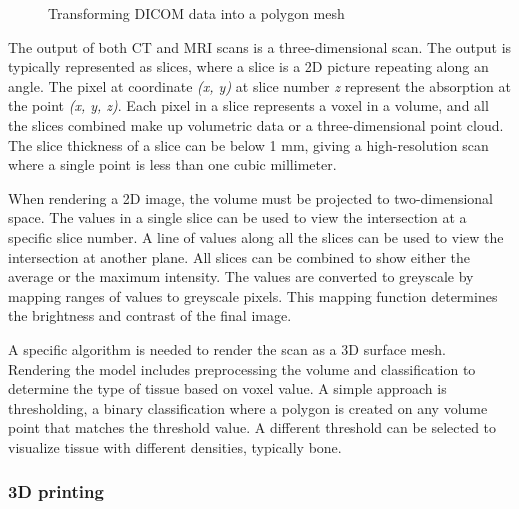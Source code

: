 \documentclass[a4paper]{report}
\begin{document}
\begin{figure}[h!]
    \centering
	\hfill
  \caption{Transforming DICOM data into a polygon mesh}
\end{figure}

The output of both CT and MRI scans is a three-dimensional scan. The output is typically represented as slices, where a slice is a 2D picture repeating along an angle. The pixel at coordinate \emph{(x, y)} at slice number \emph{z} represent the absorption at the point \emph{(x, y, z)}\cite{chougule_conversions_2013}.
Each pixel in a slice represents a voxel in a volume, and all the slices combined make up volumetric data or a three-dimensional point cloud\cite{chougule_conversions_2013}.
The slice thickness of a slice can be below 1 mm, giving a high-resolution scan where a single point is less than one cubic millimeter\cite{hamblen_outline_2010}.

When rendering a 2D image, the volume must be projected to two-dimensional space. The values in a single slice can be used to view the intersection at a specific slice number. A line of values along all the slices can be used to view the intersection at another plane.
All slices can be combined to show either the average or the maximum intensity\cite{fishman_volume_2006}.
The values are converted to greyscale by mapping ranges of values to greyscale pixels. This mapping function determines the brightness and contrast of the final image.

A specific algorithm is needed to render the scan as a 3D surface mesh. Rendering the model includes preprocessing the volume and classification to determine the type of tissue based on voxel value. A simple approach is thresholding, a binary classification where a polygon is created on any volume point that matches the threshold value. A different threshold can be selected to visualize tissue with different densities, typically bone\cite{fishman_volume_2006}.

\subsubsection{ 3D printing }
\end{document}
